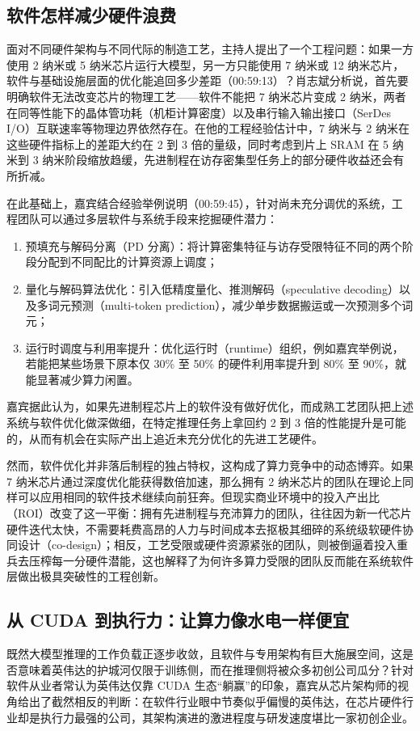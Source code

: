 \documentclass[UTF8,a4paper,11pt,fontset=fandol]{ctexart}
\begin{document}
\subsection{软件怎样减少硬件浪费}
面对不同硬件架构与不同代际的制造工艺，主持人提出了一个工程问题：如果一方使用 2 纳米或 5 纳米芯片运行大模型，另一方只能使用 7 纳米或 12 纳米芯片，软件与基础设施层面的优化能追回多少差距（00:59:13）？肖志斌分析说，首先要明确软件无法改变芯片的物理工艺——软件不能把 7 纳米芯片变成 2 纳米，两者在同等性能下的晶体管功耗（机柜计算密度）以及串行输入输出接口（SerDes I/O）互联速率等物理边界依然存在。在他的工程经验估计中，7 纳米与 2 纳米在这些硬件指标上的差距大约在 2 到 3 倍的量级，同时考虑到片上 SRAM 在 5 纳米到 3 纳米阶段缩放趋缓，先进制程在访存密集型任务上的部分硬件收益还会有所折减。

在此基础上，嘉宾结合经验举例说明（00:59:45），针对尚未充分调优的系统，工程团队可以通过多层软件与系统手段来挖掘硬件潜力：
\begin{enumerate}
\item 预填充与解码分离（PD 分离）：将计算密集特征与访存受限特征不同的两个阶段分配到不同配比的计算资源上调度；
\item 量化与解码算法优化：引入低精度量化、推测解码（speculative decoding）以及多词元预测（multi-token prediction），减少单步数据搬运或一次预测多个词元；
\item 运行时调度与利用率提升：优化运行时（runtime）组织，例如嘉宾举例说，若能把某些场景下原本仅 30\% 至 50\% 的硬件利用率提升到 80\% 至 90\%，就能显著减少算力闲置。
\end{enumerate}
嘉宾据此认为，如果先进制程芯片上的软件没有做好优化，而成熟工艺团队把上述系统与软件优化做深做细，在特定推理任务上拿回约 2 到 3 倍的性能提升是可能的，从而有机会在实际产出上追近未充分优化的先进工艺硬件。

然而，软件优化并非落后制程的独占特权，这构成了算力竞争中的动态博弈。如果 7 纳米芯片通过深度优化能获得数倍加速，那么拥有 2 纳米芯片的团队在理论上同样可以应用相同的软件技术继续向前狂奔。但现实商业环境中的投入产出比（ROI）改变了这一平衡：拥有先进制程与充沛算力的团队，往往因为新一代芯片硬件迭代太快，不需要耗费高昂的人力与时间成本去抠极其细碎的系统级软硬件协同设计（co-design）；相反，工艺受限或硬件资源紧张的团队，则被倒逼着投入重兵去压榨每一分硬件潜能，这也解释了为何许多算力受限的团队反而能在系统软件层做出极具突破性的工程创新。

\subsection{从 CUDA 到执行力：让算力像水电一样便宜}
既然大模型推理的工作负载正逐步收敛，且软件与专用架构有巨大施展空间，这是否意味着英伟达的护城河仅限于训练侧，而在推理侧将被众多初创公司瓜分？针对软件从业者常认为英伟达仅靠 CUDA 生态“躺赢”的印象，嘉宾从芯片架构师的视角给出了截然相反的判断：在软件行业眼中节奏似乎偏慢的英伟达，在芯片硬件行业却是执行力最强的公司，其架构演进的激进程度与研发速度堪比一家初创企业。
\end{document}
